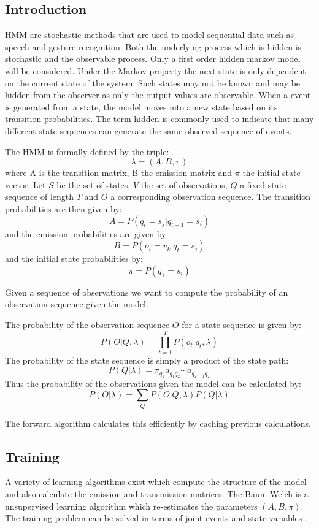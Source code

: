 \subsection{Introduction}



\ac{HMM} are stochastic methods that are used to model sequential data such as speech and gesture recognition. Both the underlying process which is hidden is stochastic and the observable process. Only a first order hidden markov model will be considered.
Under the Markov property the next state is only dependent on the current state of the system. Such states may not be known and may be hidden from the observer as only the output values are observable. When a event is generated from a state, the model moves into a new state based on its transition probabilities. The term hidden is commonly used to indicate that many different state sequences can generate the same observed sequence of events.

The \ac{HMM} is formally defined by the triple:
\[\lambda = (A,B,\pi) \]
where A is the transition matrix, B the emission matrix and $\pi$ the initial state vector. Let $S$ be the set of states, $V$ the set of observations, $Q$ a fixed state sequence of length $T$ and $O$ a corresponding observation sequence.
The transition probabilities are then given by:
\[ A = P(q_t = s_j | q_{t-1} = s_i) \]
and the emission probabilities are given by:
\[ B = P(o_t = v_k | q_t = s_i) \]
and the initial state probabilities by:
\[ \pi = P(q_1 = s_i) \]

Given a sequence of observations we want to compute the probability of an observation sequence given the model.

The probability of the observation sequence $O$ for a state sequence is given by:
\[ P(O|Q,\lambda) = \prod^T_{t=1} P(o_t | q_t,\lambda) \]
The probability of the state sequence is simply a product of the state path:
\[ P(Q|\lambda)= \pi_{q_1}a_{q_1 q_2} \cdots a_{q_{T-1} q_T} \]
Thus the probability of the observations given the model can be calculated by:
\[ P(O|\lambda) = \sum_Q P(O|Q,\lambda) P(Q|\lambda) \]

The forward algorithm calculates this efficiently by caching previous calculations.

\subsection{Training}

A variety of learning algorithms exist which compute the structure of the model and also calculate the emission and transmission matrices. The Baum-Welch is a unsupervised learning algorithm which re-estimates the parameters $(A,B,\pi)$. The training problem can be solved in terms of joint events and state variables \cite{Baum1970}.

